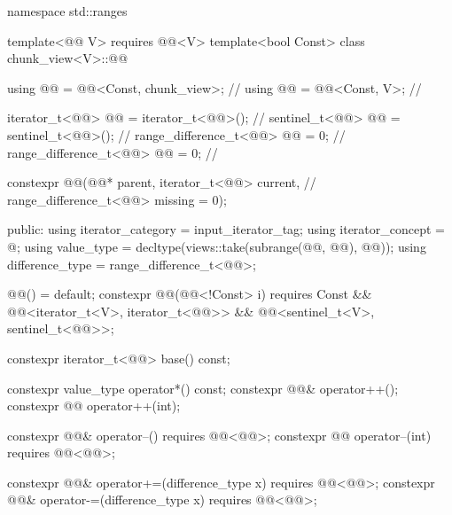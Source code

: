 \begin{codeblock}
namespace std::ranges {
  template<@@ V>
    requires @@<V>
  template<bool Const>
  class chunk_view<V>::@@ {
    using @@ = @@<Const, chunk_view>;                      // \expos
    using @@ = @@<Const, V>;                                 // \expos

    iterator_t<@@> @@ = iterator_t<@@>();                     // \expos
    sentinel_t<@@> @@ = sentinel_t<@@>();                         // \expos
    range_difference_t<@@> @@ = 0;                                    // \expos
    range_difference_t<@@> @@ = 0;                              // \expos

    constexpr @@(@@* parent, iterator_t<@@> current,       // \expos
                       range_difference_t<@@> missing = 0);

  public:
    using iterator_category = input_iterator_tag;
    using iterator_concept = @\seebelow@;
    using value_type = decltype(views::take(subrange(@@, @@), @@));
    using difference_type = range_difference_t<@@>;

    @@() = default;
    constexpr @@(@@<!Const> i)
      requires Const && @@<iterator_t<V>, iterator_t<@@>>
                     && @@<sentinel_t<V>, sentinel_t<@@>>;

    constexpr iterator_t<@@> base() const;

    constexpr value_type operator*() const;
    constexpr @@& operator++();
    constexpr @@ operator++(int);

    constexpr @@& operator--() requires @@<@@>;
    constexpr @@ operator--(int) requires @@<@@>;

    constexpr @@& operator+=(difference_type x)
      requires @@<@@>;
    constexpr @@& operator-=(difference_type x)
      requires @@<@@>;

}}
\end{codeblock}
